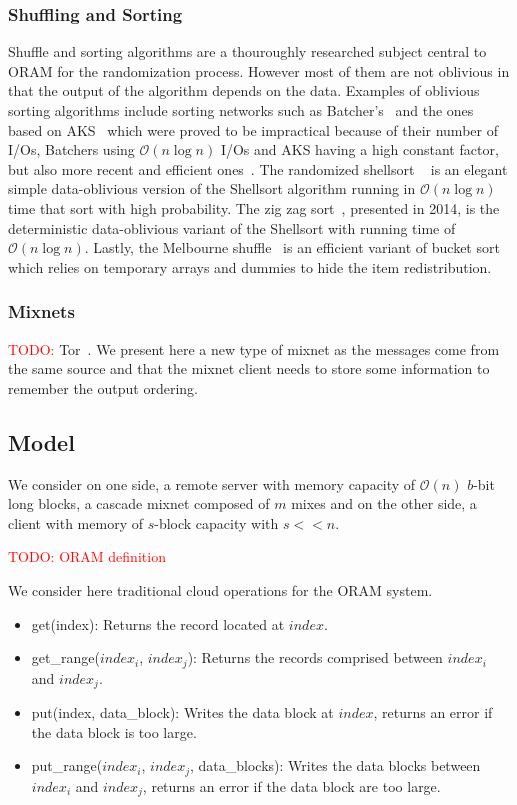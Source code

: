 \documentclass[english,oneside,twocolumn]{article}
\newcommand{\todo}[1]{\textcolor{red}{TODO: #1}}
\begin{document}
\subsubsection{Shuffling and Sorting}
Shuffle and sorting algorithms are a thouroughly researched subject central to ORAM for the randomization process. However most of them are not oblivious in that the output of the algorithm depends on the data.
Examples of oblivious sorting algorithms include sorting networks such as Batcher's~\cite{batcher1968sorting} and the ones based on AKS~\cite{ajtai19830} which were proved to be impractical because of their number of I/Os, Batchers using $\mathcal{O}\left ( n \log n \right)$ I/Os and AKS having a high constant factor, but also more recent and efficient ones~\cite{paterson1990improved}.
The randomized shellsort ~\cite{goodrich2010randomized} is an elegant simple data-oblivious version of the Shellsort algorithm running in $\mathcal{O}\left ( n \log n \right)$ time that sort with high probability.
The zig zag sort~\cite{goodrich2014zig}, presented in 2014, is the deterministic data-oblivious variant of the Shellsort with running time of $\mathcal{O}\left ( n \log n\right)$.
Lastly, the Melbourne shuffle~\cite{ohrimenko2014melbourne} is an efficient variant of bucket sort which relies on temporary arrays and dummies to hide the item redistribution.

\subsubsection{Mixnets}
\todo{} Tor~\cite{dingledine2004tor}. 
We present here a new type of mixnet as the messages come from the same source and that the mixnet client needs to store some information to remember the output ordering.

\subsection{Model}
We consider on one side, a remote server with memory capacity of $\mathcal{O}\left(n\right)$ $b$-bit long blocks, a cascade mixnet composed of $m$ mixes and on the other side, a client with memory of $s$-block capacity with $s<<n$.

\todo{ORAM definition}

We consider here traditional cloud operations for the ORAM system.
\begin{itemize}
 \item get(index): Returns the record located at $index$.
 \item get\_range($index_i$, $index_j$): Returns the records comprised between $index_i$ and $index_j$.
 \item put(index, data\_block):  Writes the data block at $index$, returns an error if the data block is too large.
 \item put\_range($index_i$, $index_j$, data\_blocks): Writes the data blocks between $index_i$ and $index_j$, returns an error if the data block are too large.
\end{itemize}
\end{document}
